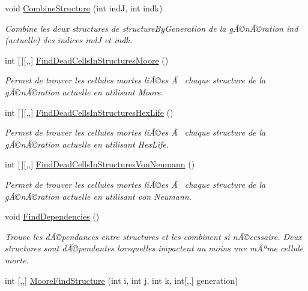 \begin{DoxyCompactItemize}
void \mbox{\hyperlink{class_detection_a7a133b5ef43e949260afb4685766e0ca}{Combine\+Structure}} (int indJ, int indk)
\begin{DoxyCompactList}\small\item\em Combine les deux structures de structure\+By\+Generation de la gÃ©nÃ©ration ind (actuelle) des indices indJ et indk. \end{DoxyCompactList}\item 
int \mbox{[}$\,$\mbox{]}\mbox{[},,\mbox{]} \mbox{\hyperlink{class_detection_a018511f85c3fb9eca82fc06c9f4eb031}{Find\+Dead\+Cells\+In\+Structures\+Moore}} ()
\begin{DoxyCompactList}\small\item\em Permet de trouver les cellules mortes liÃ©es Ã  chaque structure de la gÃ©nÃ©ration actuelle en utilisant Moore. \end{DoxyCompactList}\item 
int \mbox{[}$\,$\mbox{]}\mbox{[},,\mbox{]} \mbox{\hyperlink{class_detection_ac836468018dc40fd2261136a035eb25a}{Find\+Dead\+Cells\+In\+Structures\+Hex\+Life}} ()
\begin{DoxyCompactList}\small\item\em Permet de trouver les cellules mortes liÃ©es Ã  chaque structure de la gÃ©nÃ©ration actuelle en utilisant Hex\+Life. \end{DoxyCompactList}\item 
int \mbox{[}$\,$\mbox{]}\mbox{[},,\mbox{]} \mbox{\hyperlink{class_detection_aeea8bac4d15d3dd92d6b907b357c1680}{Find\+Dead\+Cells\+In\+Structures\+Von\+Neumann}} ()
\begin{DoxyCompactList}\small\item\em Permet de trouver les cellules mortes liÃ©es Ã  chaque structure de la gÃ©nÃ©ration actuelle en utilisant von Neumann. \end{DoxyCompactList}\item 
void \mbox{\hyperlink{class_detection_a0f5d7b85c0daaf07503132a2faa23bcf}{Find\+Dependencies}} ()
\begin{DoxyCompactList}\small\item\em Trouve les dÃ©pendances entre structures et les combinent si nÃ©cessaire. Deux structures sont dÃ©pendantes lorsqu\textquotesingle{}elles impactent au moins une mÃªme cellule morte. \end{DoxyCompactList}\item 
int \mbox{[},,\mbox{]} \mbox{\hyperlink{class_detection_a3d3b6bfd7fe37149108908d230fcc9f1}{Moore\+Find\+Structure}} (int i, int j, int k, int\mbox{[},,\mbox{]} generation)

\end{DoxyCompactItemize}
